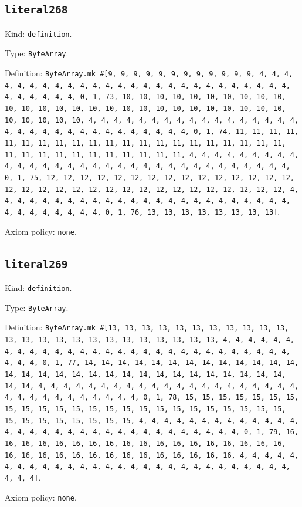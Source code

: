 \documentclass[11pt]{article}
\begin{document}
\subsection*{\texttt{literal268}}
\noindent Kind: \texttt{definition}.\par
\noindent Type: \texttt{ByteArray}.\par
\noindent Definition: \texttt{ByteArray.mk \#[9, 9, 9, 9, 9, 9, 9, 9, 9, 9, 9, 9, 4, 4, 4, 4, 4, 4, 4, 4, 4, 4, 4, 4, 4, 4, 4, 4, 4, 4, 4, 4, 4, 4, 4, 4, 4, 4, 4, 4, 4, 4, 4, 4, 0, 1, 73, 10, 10, 10, 10, 10, 10, 10, 10, 10, 10, 10, 10, 10, 10, 10, 10, 10, 10, 10, 10, 10, 10, 10, 10, 10, 10, 10, 10, 10, 10, 10, 10, 4, 4, 4, 4, 4, 4, 4, 4, 4, 4, 4, 4, 4, 4, 4, 4, 4, 4, 4, 4, 4, 4, 4, 4, 4, 4, 4, 4, 4, 4, 4, 4, 0, 1, 74, 11, 11, 11, 11, 11, 11, 11, 11, 11, 11, 11, 11, 11, 11, 11, 11, 11, 11, 11, 11, 11, 11, 11, 11, 11, 11, 11, 11, 11, 11, 11, 11, 4, 4, 4, 4, 4, 4, 4, 4, 4, 4, 4, 4, 4, 4, 4, 4, 4, 4, 4, 4, 4, 4, 4, 4, 4, 4, 4, 4, 4, 4, 4, 4, 0, 1, 75, 12, 12, 12, 12, 12, 12, 12, 12, 12, 12, 12, 12, 12, 12, 12, 12, 12, 12, 12, 12, 12, 12, 12, 12, 12, 12, 12, 12, 12, 12, 12, 12, 4, 4, 4, 4, 4, 4, 4, 4, 4, 4, 4, 4, 4, 4, 4, 4, 4, 4, 4, 4, 4, 4, 4, 4, 4, 4, 4, 4, 4, 4, 4, 4, 0, 1, 76, 13, 13, 13, 13, 13, 13, 13, 13]}.\par
\noindent Axiom policy: \texttt{none}.\par
\subsection*{\texttt{literal269}}
\noindent Kind: \texttt{definition}.\par
\noindent Type: \texttt{ByteArray}.\par
\noindent Definition: \texttt{ByteArray.mk \#[13, 13, 13, 13, 13, 13, 13, 13, 13, 13, 13, 13, 13, 13, 13, 13, 13, 13, 13, 13, 13, 13, 13, 13, 4, 4, 4, 4, 4, 4, 4, 4, 4, 4, 4, 4, 4, 4, 4, 4, 4, 4, 4, 4, 4, 4, 4, 4, 4, 4, 4, 4, 4, 4, 4, 4, 0, 1, 77, 14, 14, 14, 14, 14, 14, 14, 14, 14, 14, 14, 14, 14, 14, 14, 14, 14, 14, 14, 14, 14, 14, 14, 14, 14, 14, 14, 14, 14, 14, 14, 14, 4, 4, 4, 4, 4, 4, 4, 4, 4, 4, 4, 4, 4, 4, 4, 4, 4, 4, 4, 4, 4, 4, 4, 4, 4, 4, 4, 4, 4, 4, 4, 4, 0, 1, 78, 15, 15, 15, 15, 15, 15, 15, 15, 15, 15, 15, 15, 15, 15, 15, 15, 15, 15, 15, 15, 15, 15, 15, 15, 15, 15, 15, 15, 15, 15, 15, 15, 4, 4, 4, 4, 4, 4, 4, 4, 4, 4, 4, 4, 4, 4, 4, 4, 4, 4, 4, 4, 4, 4, 4, 4, 4, 4, 4, 4, 4, 4, 4, 4, 0, 1, 79, 16, 16, 16, 16, 16, 16, 16, 16, 16, 16, 16, 16, 16, 16, 16, 16, 16, 16, 16, 16, 16, 16, 16, 16, 16, 16, 16, 16, 16, 16, 16, 16, 4, 4, 4, 4, 4, 4, 4, 4, 4, 4, 4, 4, 4, 4, 4, 4, 4, 4, 4, 4, 4, 4, 4, 4, 4, 4, 4, 4, 4, 4, 4]}.\par
\noindent Axiom policy: \texttt{none}.\par
\end{document}
